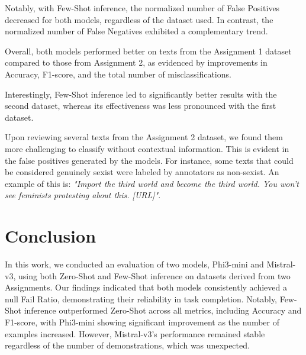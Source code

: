 \documentclass[11pt]{article}
\begin{document}
Notably, with Few-Shot inference, the normalized number of False Positives decreased for both models, regardless of the dataset used. In contrast, the normalized number of False Negatives exhibited a complementary trend.

Overall, both models performed better on texts from the Assignment 1 dataset compared to those from Assignment 2, as evidenced by improvements in Accuracy, F1-score, and the total number of misclassifications.

Interestingly, Few-Shot inference led to significantly better results with the second dataset, whereas its effectiveness was less pronounced with the first dataset.

Upon reviewing several texts from the Assignment 2 dataset, we found them more challenging to classify without contextual information. This is evident in the false positives generated by the models. For instance, some texts that could be considered genuinely sexist were labeled by annotators as non-sexist. An example of this is: \textit{"Import the third world and become the third world. You won’t see feminists protesting about this. [URL]"}.







\section{Conclusion}
\label{sec:conclusion}
In this work, we conducted an evaluation of two models, Phi3-mini and Mistral-v3, using both Zero-Shot and Few-Shot inference on datasets derived from two Assignments. Our findings indicated that both models consistently achieved a null Fail Ratio, demonstrating their reliability in task completion. Notably, Few-Shot inference outperformed Zero-Shot across all metrics, including Accuracy and F1-score, with Phi3-mini showing significant improvement as the number of examples increased. However, Mistral-v3's performance remained stable regardless of the number of demonstrations, which was unexpected.
\end{document}
